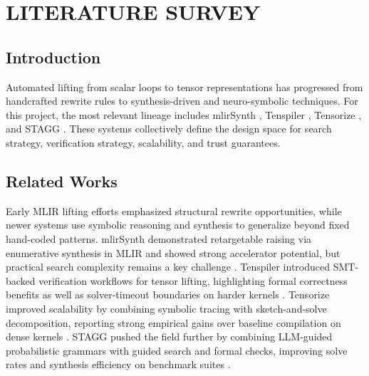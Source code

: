 \chapter{LITERATURE SURVEY}
\section{Introduction}
Automated lifting from scalar loops to tensor representations has progressed from handcrafted rewrite rules to synthesis-driven and neuro-symbolic techniques. For this project, the most relevant lineage includes mlirSynth \cite{mlirsynth}, Tenspiler \cite{tenspiler}, Tensorize \cite{tensorize}, and STAGG \cite{stagg}. These systems collectively define the design space for search strategy, verification strategy, scalability, and trust guarantees.

\section{Related Works }
Early MLIR lifting efforts emphasized structural rewrite opportunities, while newer systems use symbolic reasoning and synthesis to generalize beyond fixed hand-coded patterns. mlirSynth demonstrated retargetable raising via enumerative synthesis in MLIR and showed strong accelerator potential, but practical search complexity remains a key challenge \cite{mlirsynth}. Tenspiler introduced SMT-backed verification workflows for tensor lifting, highlighting formal correctness benefits as well as solver-timeout boundaries on harder kernels \cite{tenspiler}. Tensorize improved scalability by combining symbolic tracing with sketch-and-solve decomposition, reporting strong empirical gains over baseline compilation on dense kernels \cite{tensorize}. STAGG pushed the field further by combining LLM-guided probabilistic grammars with guided search and formal checks, improving solve rates and synthesis efficiency on benchmark suites \cite{stagg}.


